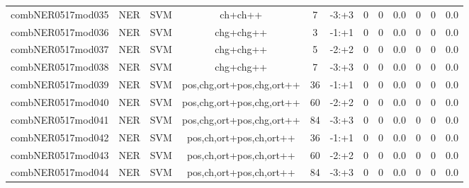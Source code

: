 \documentclass[a4paper]{article}
\begin{document}
\begin{landscape}
\begin{center}
\begin{tabular}{ |c|c|c|c|c|c|c|c|c|c|c|c|}
 
 	
 	\small{ combNER0517mod035 } & \small{ NER} & \small{  SVM }  & ch+ch++  &  7 &  \small{  -3:+3 }  &  0 & 0 & 0.0  &  0 & 0 & 0.0 \\
 	

 
 	
 	\small{ combNER0517mod036 } & \small{ NER} & \small{  SVM }  & chg+chg++  &  3 &  \small{  -1:+1 }  &  0 & 0 & 0.0  &  0 & 0 & 0.0 \\
 	

 
 	
 	\small{ combNER0517mod037 } & \small{ NER} & \small{  SVM }  & chg+chg++  &  5 &  \small{  -2:+2 }  &  0 & 0 & 0.0  &  0 & 0 & 0.0 \\
 	

 
 	
 	\small{ combNER0517mod038 } & \small{ NER} & \small{  SVM }  & chg+chg++  &  7 &  \small{  -3:+3 }  &  0 & 0 & 0.0  &  0 & 0 & 0.0 \\
 	

 
 	
 	\small{ combNER0517mod039 } & \small{ NER} & \small{  SVM }  & pos,chg,ort+pos,chg,ort++  &  36 &  \small{  -1:+1 }  &  0 & 0 & 0.0  &  0 & 0 & 0.0 \\
 	

 
 	
 	\small{ combNER0517mod040 } & \small{ NER} & \small{  SVM }  & pos,chg,ort+pos,chg,ort++  &  60 &  \small{  -2:+2 }  &  0 & 0 & 0.0  &  0 & 0 & 0.0 \\
 	

 
 	
 	\small{ combNER0517mod041 } & \small{ NER} & \small{  SVM }  & pos,chg,ort+pos,chg,ort++  &  84 &  \small{  -3:+3 }  &  0 & 0 & 0.0  &  0 & 0 & 0.0 \\
 	

 
 	
 	\small{ combNER0517mod042 } & \small{ NER} & \small{  SVM }  & pos,ch,ort+pos,ch,ort++  &  36 &  \small{  -1:+1 }  &  0 & 0 & 0.0  &  0 & 0 & 0.0 \\
 	

 
 	
 	\small{ combNER0517mod043 } & \small{ NER} & \small{  SVM }  & pos,ch,ort+pos,ch,ort++  &  60 &  \small{  -2:+2 }  &  0 & 0 & 0.0  &  0 & 0 & 0.0 \\
 	

 
 	
 	\small{ combNER0517mod044 } & \small{ NER} & \small{  SVM }  & pos,ch,ort+pos,ch,ort++  &  84 &  \small{  -3:+3 }  &  0 & 0 & 0.0  &  0 & 0 & 0.0 \\
 	


\end{tabular}
\end{center}
\end{landscape}
\end{document}
